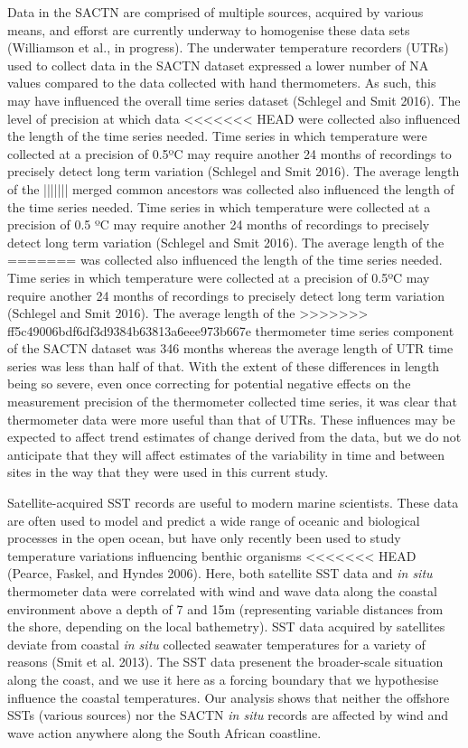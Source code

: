 \documentclass[12pt,A4paper,]{article}
\begin{document}
Data in the SACTN are comprised of multiple sources, acquired by various
means, and efforst are currently underway to homogenise these data sets
(Williamson et al., in progress). The underwater temperature recorders
(UTRs) used to collect data in the SACTN dataset expressed a lower
number of NA values compared to the data collected with hand
thermometers. As such, this may have influenced the overall time series
dataset (Schlegel and Smit 2016). The level of precision at which data
<<<<<<< HEAD
were collected also influenced the length of the time series needed.
Time series in which temperature were collected at a precision of 0.5ºC
may require another 24 months of recordings to precisely detect long
term variation (Schlegel and Smit 2016). The average length of the
||||||| merged common ancestors
was collected also influenced the length of the time series needed. Time
series in which temperature were collected at a precision of 0.5 ºC may
require another 24 months of recordings to precisely detect long term
variation (Schlegel and Smit 2016). The average length of the
=======
was collected also influenced the length of the time series needed. Time
series in which temperature were collected at a precision of 0.5ºC may
require another 24 months of recordings to precisely detect long term
variation (Schlegel and Smit 2016). The average length of the
>>>>>>> ff5c49006bdf6df3d9384b63813a6eee973b667e
thermometer time series component of the SACTN dataset was 346 months
whereas the average length of UTR time series was less than half of
that. With the extent of these differences in length being so severe,
even once correcting for potential negative effects on the measurement
precision of the thermometer collected time series, it was clear that
thermometer data were more useful than that of UTRs. These influences
may be expected to affect trend estimates of change derived from the
data, but we do not anticipate that they will affect estimates of the
variability in time and between sites in the way that they were used in
this current study.

Satellite-acquired SST records are useful to modern marine scientists.
These data are often used to model and predict a wide range of oceanic
and biological processes in the open ocean, but have only recently been
used to study temperature variations influencing benthic organisms
<<<<<<< HEAD
(Pearce, Faskel, and Hyndes 2006). Here, both satellite SST data and
\emph{in situ} thermometer data were correlated with wind and wave data
along the coastal environment above a depth of 7 and 15m (representing
variable distances from the shore, depending on the local bathemetry).
SST data acquired by satellites deviate from coastal \emph{in situ}
collected seawater temperatures for a variety of reasons (Smit et al.
2013). The SST data presenent the broader-scale situation along the
coast, and we use it here as a forcing boundary that we hypothesise
influence the coastal temperatures. Our analysis shows that neither the
offshore SSTs (various sources) nor the SACTN \emph{in situ} records are
affected by wind and wave action anywhere along the South African
coastline.
\end{document}
